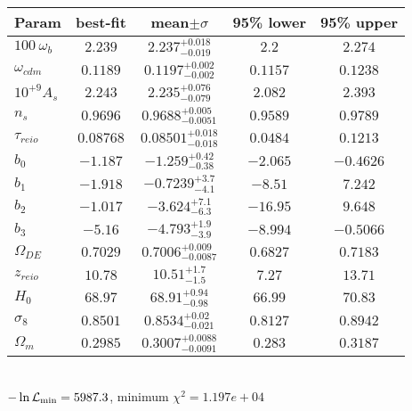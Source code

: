 \begin{tabular}{|l|c|c|c|c|} 
 \hline 
Param & best-fit & mean$\pm\sigma$ & 95\% lower & 95\% upper \\ \hline 
$100~\omega_{b }$ &$2.239$ & $2.237_{-0.019}^{+0.018}$ & $2.2$ & $2.274$ \\ 
$\omega_{cdm }$ &$0.1189$ & $0.1197_{-0.002}^{+0.002}$ & $0.1157$ & $0.1238$ \\ 
$10^{+9}A_{s }$ &$2.243$ & $2.235_{-0.079}^{+0.076}$ & $2.082$ & $2.393$ \\ 
$n_{s }$ &$0.9696$ & $0.9688_{-0.0051}^{+0.005}$ & $0.9589$ & $0.9789$ \\ 
$\tau_{reio }$ &$0.08768$ & $0.08501_{-0.018}^{+0.018}$ & $0.0484$ & $0.1213$ \\ 
$b_{0 }$ &$-1.187$ & $-1.259_{-0.38}^{+0.42}$ & $-2.065$ & $-0.4626$ \\ 
$b_{1 }$ &$-1.918$ & $-0.7239_{-4.1}^{+3.7}$ & $-8.51$ & $7.242$ \\ 
$b_{2 }$ &$-1.017$ & $-3.624_{-6.3}^{+7.1}$ & $-16.95$ & $9.648$ \\ 
$b_{3 }$ &$-5.16$ & $-4.793_{-3.9}^{+1.9}$ & $-8.994$ & $-0.5066$ \\ 
$\Omega_{DE}$ &$0.7029$ & $0.7006_{-0.0087}^{+0.009}$ & $0.6827$ & $0.7183$ \\ 
$z_{reio }$ &$10.78$ & $10.51_{-1.5}^{+1.7}$ & $7.27$ & $13.71$ \\ 
$H_{0 }$ &$68.97$ & $68.91_{-0.98}^{+0.94}$ & $66.99$ & $70.83$ \\ 
$\sigma_8$ &$0.8501$ & $0.8534_{-0.021}^{+0.02}$ & $0.8127$ & $0.8942$ \\ 
$\Omega_{m }$ &$0.2985$ & $0.3007_{-0.0091}^{+0.0088}$ & $0.283$ & $0.3187$ \\ 
\hline 
 \end{tabular} \\ 
$-\ln{\cal L}_\mathrm{min} =5987.3$, minimum $\chi^2=1.197e+04$ \\ 
